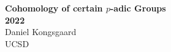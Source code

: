 \hypersetup{pageanchor=false}
\begin{titlingpage}
  \centering
  {\Huge\bfseries Cohomology of certain $p$-adic Groups} \\[1.5em]
  {\huge\bfseries 2022} \\[2.5em]
  {\huge Daniel Kongsgaard} \\[1.5em]
  \vfill
  {\Large UCSD}
\end{titlingpage}
\hypersetup{pageanchor=true}

